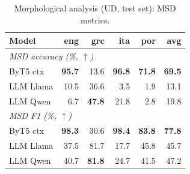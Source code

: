 \begin{table}[h]
\centering
\small
\setlength{\tabcolsep}{5pt}
\renewcommand{\arraystretch}{1.10}
\begin{tabular}{lrrrrr}
\toprule
Model & eng & grc & ita & por & avg \\
\midrule
\multicolumn{6}{l}{\textit{\acs{MSD} accuracy (\%, $\uparrow$)}} \\
ByT5 ctx & \textbf{95.7} & 13.6 & \textbf{96.8} & \textbf{71.8} & \textbf{69.5} \\
LLM Llama & 10.5 & 36.6 & 3.5 & 1.9 & 13.1 \\
LLM Qwen & 6.7 & \textbf{47.8} & 21.8 & 2.8 & 19.8 \\
\midrule
\multicolumn{6}{l}{\textit{\acs{MSD} F1 (\%, $\uparrow$)}} \\
ByT5 ctx & \textbf{98.3} & 30.6 & \textbf{98.4} & \textbf{83.8} & \textbf{77.8} \\
LLM Llama & 37.5 & 81.7 & 17.7 & 45.8 & 45.7 \\
LLM Qwen & 40.7 & \textbf{81.8} & 24.7 & 41.5 & 47.2 \\
\bottomrule
\end{tabular}
\caption{Morphological analysis (UD, test set): \acs{MSD} metrics.}
\label{tab:results-analysis-ud-msd-matrix}
\end{table}

